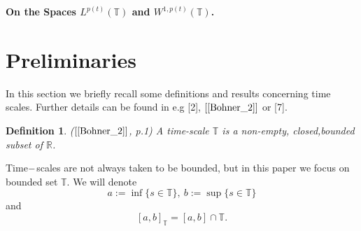 \documentclass[12pt,a4paper,oneside,titlepage]{article}
\newtheorem{Def}{Definition}
\begin{document}
\begin{center}





\begin{LARGE}
\textbf{
On the Spaces $L^{p(t)} (\mathbb{T})$ and $W^{1,p(t)}(\mathbb{T})$.}
\end{LARGE}
\end{center}

\section{Preliminaries}
In this section we briefly recall some definitions and results concerning time scales. Further details can be found in e.g [2], $[\ref{Bohner_2}]$ or [7].

\begin{Def} ($[\ref{Bohner_2}]$, p.1) A time-scale $\mathbb{T}$ is a non-empty, closed,bounded subset of $\mathbb{R}$.
 
\end{Def}
\smallskip
Time$\-- $scales are not always taken to be bounded, but in this paper we focus on bounded set $\mathbb{T}$. 
We will denote
\begin{equation}
\label{kresy}
a := \inf \lbrace s \in \mathbb{T} \rbrace , ~b := \sup \lbrace s \in\mathbb{T} \rbrace
\end{equation}
and
\begin{equation}
\nonumber
[a,b]_{\mathbb{T}} = [a,b] \cap \mathbb{T}.
\end{equation}
\end{document}
